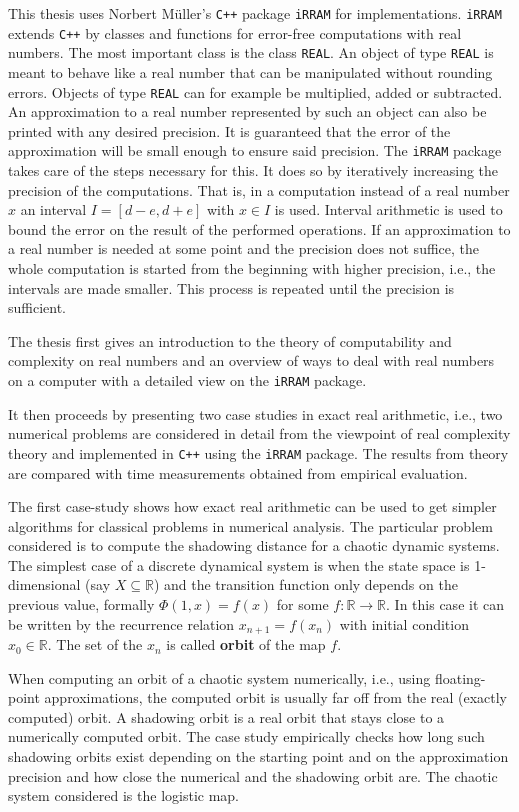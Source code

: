 \documentclass[]{article}
\newcommand{\RR}{\mathbb R}
\newcommand{\code}{\texttt}
\newcommand{\cc}{\code{C++}\xspace}
\newcommand{\irram}{\code{iRRAM}\xspace}
\newcommand{\real}{\code{REAL}\xspace}
\begin{document}
This thesis uses Norbert M\"{u}ller's \cc package \irram \cite{irram} for implementations.
\irram extends \cc by classes and functions for error-free computations with
real numbers.
The most important class is the class \real. An object of type \real is meant
to behave like a  real number that can be manipulated without rounding errors.
Objects of type \real can for example be multiplied, added or subtracted.
An approximation to a real number represented by such an object can also be
printed with any desired precision.
It is guaranteed that the error of the approximation will be small enough to
ensure said precision.
The \irram package takes care of the steps necessary for this. 
It does so by iteratively increasing the precision of the computations.
That is, in a computation instead of a real number $x$ an interval $I = [d-e,
d+e]$ with $x \in I$ is used.
Interval arithmetic is used to bound the error on the result of the performed
operations.
If an approximation to a real number is needed at some point and the precision
does not suffice, the whole computation is started from the beginning with
higher precision, i.e., the intervals are made smaller. 
This process is repeated until the precision is sufficient.

The thesis first gives an introduction to the theory of computability and
complexity on real numbers and an overview of ways to deal with real numbers on
a computer with a detailed view on the \irram package.

It then proceeds by presenting two case studies in exact real arithmetic, i.e.,
two numerical problems are considered in detail from the viewpoint of real
complexity theory and implemented in \cc using the \irram package. 
The results from theory are compared with time measurements obtained from
empirical evaluation.

The first case-study shows how exact real arithmetic can be used to get simpler
algorithms for classical problems in numerical analysis.
The particular problem considered is to compute the shadowing distance for a chaotic
dynamic systems.
The simplest case of a discrete dynamical system is when the state space is 1-dimensional (say $X \subseteq \RR$) and 
the transition function only depends on the previous value,
formally $\Phi(1,x) = f(x)$ for some $f : \RR \to \RR$. 
In this case it can be written by the recurrence relation $x_{n+1} = f(x_n)$ with initial condition $x_0 \in \RR$.
The set of the $x_n$ is called \textbf{orbit} of the map $f$.

When computing an orbit of a chaotic system numerically, i.e., using floating-point
approximations, the computed orbit is usually far off from the real (exactly
computed) orbit. 
A shadowing orbit is a real orbit that stays close to a numerically computed
orbit.
The case study empirically checks how long such shadowing orbits exist
depending on the starting point and on the approximation precision and how
close the numerical and the shadowing orbit are.
The chaotic system considered is the logistic map.
\end{document}
